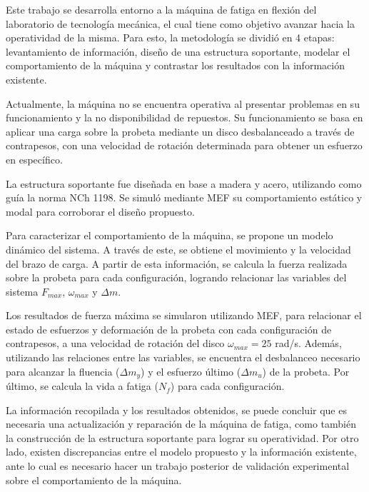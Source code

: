 
Este trabajo se desarrolla entorno a la máquina de fatiga en flexión del laboratorio de tecnología mecánica, el cual tiene como objetivo avanzar hacia la operatividad de la misma. Para esto, la metodología se dividió en 4 etapas: levantamiento de información, diseño de una estructura soportante, modelar el comportamiento de la máquina y contrastar los resultados con la información existente.

Actualmente, la máquina no se encuentra operativa al presentar problemas en su funcionamiento y la no disponibilidad de repuestos. Su funcionamiento se basa en aplicar una carga sobre la probeta mediante un disco desbalanceado a través de contrapesos, con una velocidad de rotación determinada para obtener un esfuerzo en específico.

La estructura soportante fue diseñada en base a madera y acero, utilizando como guía la norma NCh 1198. Se simuló mediante MEF su comportamiento estático y modal para corroborar el diseño propuesto.

Para caracterizar el comportamiento de la máquina, se propone un modelo dinámico del sistema. A través de este, se obtiene el movimiento y la velocidad del brazo de carga. A partir de esta información, se calcula la fuerza realizada sobre la probeta para cada configuración, logrando relacionar las variables del sistema $F_{max}$, $\omega_{max}$ y $\Delta m$. 

Los resultados de fuerza máxima se simularon utilizando MEF, para relacionar el estado de esfuerzos y deformación de la probeta con cada configuración de contrapesos, a una velocidad de rotación del disco $\omega_{max}=25$ rad/s. Además, utilizando las relaciones entre las variables, se encuentra el desbalanceo necesario para alcanzar la fluencia ($\Delta m_y$) y el esfuerzo último ($\Delta m_u$) de la probeta. Por último, se calcula la vida a fatiga ($N_f$) para cada configuración.

La información recopilada y los resultados obtenidos, se puede concluir que es necesaria una actualización y reparación de la máquina de fatiga, como también la construcción de la estructura soportante para lograr su operatividad. Por otro lado, existen discrepancias entre el modelo propuesto y la información existente, ante lo cual es necesario hacer un trabajo posterior de validación experimental sobre el comportamiento de la máquina.



